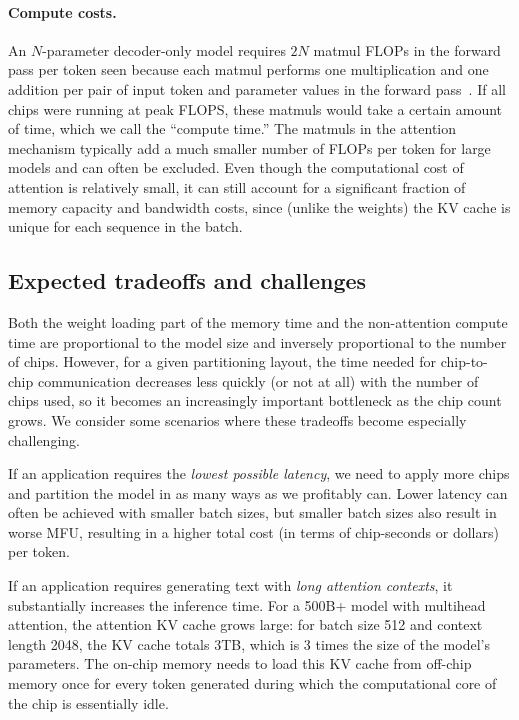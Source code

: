 \paragraph{Compute costs.} An $N$-parameter decoder-only model requires $2N$ matmul FLOPs in the forward pass per token seen because each matmul performs one multiplication and one addition per pair of input token and parameter values in the forward pass~\citep{kaplan2020scaling}. If all chips were running at peak FLOPS, these matmuls would take a certain amount of time, which we call the ``compute time.'' The matmuls in the attention mechanism typically add a much smaller number of FLOPs per token for large models and can often be excluded. Even though the computational cost of attention is relatively small, it can still account for a significant fraction of memory capacity and bandwidth costs, since (unlike the weights) the KV cache is unique for each sequence in the batch.

\subsection{Expected tradeoffs and challenges} Both the weight loading part of the memory time and the non-attention compute time are proportional to the model size and inversely proportional to the number of chips. However, for a given partitioning layout, the time needed for chip-to-chip communication decreases less quickly (or not at all) with the number of chips used, so it becomes an increasingly important bottleneck as the chip count grows. We consider some scenarios where these tradeoffs become especially challenging.

If an application requires the \emph{lowest possible latency}, we need to apply more chips and partition the model in as many ways as we profitably can. Lower latency can often be achieved with smaller batch sizes, but smaller batch sizes also result in worse MFU, resulting in a higher total cost (in terms of chip-seconds or dollars) per token. 

If an application requires generating text with \emph{long attention contexts}, it substantially increases the inference time. For a 500B+ model with multihead attention, the attention KV cache grows large: for batch size 512 and context length 2048, the KV cache totals 3TB, which is 3 times the size of the model's parameters. The on-chip memory needs to load this KV cache from off-chip memory once for every token generated during which the computational core of the chip is essentially idle. 

